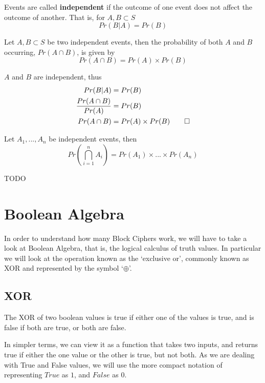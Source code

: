 \begin{defn}
Events are called \textbf{independent} if the outcome of one event does
not affect the outcome of another. That is, for $A, B \subset S$
\begin{equation}
Pr(B|A) = Pr(B)
\end{equation}
\end{defn}

\begin{thm}
Let $A, B \subset S$ be two independent events, then the probability of 
both $A$ and $B$ occurring, $Pr(A \cap B)$, is given by
\begin{equation}
Pr(A \cap B) = Pr(A) \times Pr(B)
\end{equation}
\end{thm}

\begin{prf}
$A$ and $B$ are independent, thus 
\begin{align*}
Pr(B|A) &= Pr(B)\\
\frac{Pr(A \cap B)}{Pr(A)} &= Pr(B)\\
Pr(A \cap B) &= Pr(A) \times Pr(B)\hfill\qed\\
\end{align*}
\end{prf}

\begin{thm}
Let $A_1, ... , A_n$ be independent events, then 
\begin{equation}
Pr\left(\bigcap _{i=1} ^n A_i \right) = Pr(A_1) \times ... \times Pr(A_n)
\end{equation}
\end{thm}

\begin{prf}
TODO
\end{prf}

\section{Boolean Algebra}
In order to understand how many Block Ciphers work, we will have to take a 
look at Boolean Algebra, that is, the logical calculus of truth values.
In particular we will look at the operation known as the `exclusive or', 
commonly known as XOR and represented by the symbol `$\oplus$'.

\subsection{XOR}
\begin{defn}
The XOR of two boolean values is true if either one of the values is true,
and is false if both are true, or both are false.
\end{defn}
In simpler terms, we can view it as a function that takes two inputs, and 
returns true if either the one value or the other is true, but not both.
As we are dealing with True and False values, we will use the more compact
notation of representing $True$ as $1$, and $False$ as $0$. 

